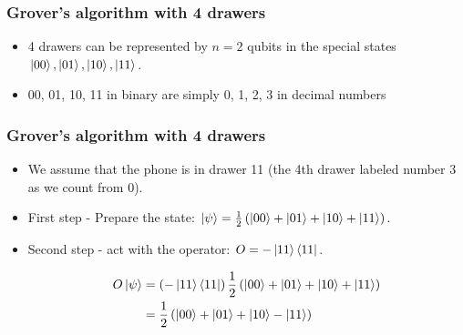 \documentclass[10pt]{beamer}
\begin{document}
  \begin{frame}
    \frametitle{Grover's algorithm with 4 drawers}
    \begin{itemize}
    \item 4 drawers can be represented by $n=2$ qubits in the special states $\ket{00}, \ket{01}, \ket{10}, \ket{11}$.
    \item 00, 01, 10, 11 in binary are simply 0, 1, 2, 3 in decimal numbers 
    \end{itemize}

  \end{frame}
  \begin{frame}
    \frametitle{Grover's algorithm with 4 drawers}
    \begin{itemize}
      
    \item<1-> We assume that the phone is in drawer 11 (the 4th drawer labeled number 3 as we count from 0).
    \item<2-> First step - Prepare the state: $\ket{\psi}=\frac{1}{2}\left( \ket{00}+\ket{01}+\ket{10}+\ket{11} \right)$.
    \item<3-> Second step - act with the operator: $O = - \ket{11}\bra{11}$.
      
\begin{align*}
  O \ket{\psi} &= \left( -\ket{11}\bra{11} \right)\frac{1}{2}\left( \ket{00} + \ket{01}+\ket{10} + \ket{11} \right) \\
  &=\frac{1}{2}\left( \ket{00} + \ket{01}+\ket{10} - \ket{11} \right)
\end{align*}
    \end{itemize}
  \end{frame}
\end{document}

